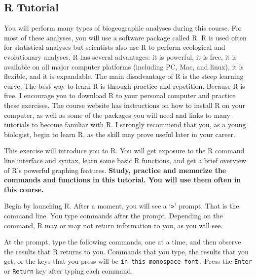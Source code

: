 \documentclass[11pt]{article}
\newcommand{\assignmentTitle}{R Tutorial}
\begin{document}
\thispagestyle{firstpage}

\subsection*{\assignmentTitle{}}

You will perform many types of biogeographic analyses during this
course. For most of these analyses, you will use a software package
called R. R is used often for statistical analyses but scientists also
use R to perform ecological and evolutionary analyses. R has several
advantages: it is powerful, it is free, it is available on all major
computer platforms (including PC, Mac, and linux), it is flexible, and
it is expandable. The main disadvantage of R is the steep learning
curve. The best way to learn R is through practice and repetition.
Because R is free, I encourage you to download R to your personal
computer and practice these exercises. The course website has
instructions on how to install R on your computer, as well as some of
the packages you will need and links to many tutorials to become
familiar with R. I strongly recommend that you, as a young biologist,
begin to learn R, as the skill may prove useful later in your career.

This exercise will introduce you to R. You will get exposure to the R
command line interface and syntax, learn some basic R functions, and get
a brief overview of R's powerful graphing features. \textbf{Study,
practice and memorize the commands and functions in this tutorial. You
will use them often in this course.}

Begin by launching R. After a moment, you will see a `\texttt{\textgreater{}}'
prompt. That is the command line. You type commands after the prompt.
Depending on the command, R may or may not return information to you, as
you will see.

At the prompt, type the following commands, one at a time, and then
observe the results that R returns to you. Commands that you type, the
results that you get, or the keys that you press will be \texttt{in this monospace
font.} Press the \texttt{Enter} or \texttt{Return} key after typing each command.
\end{document}
